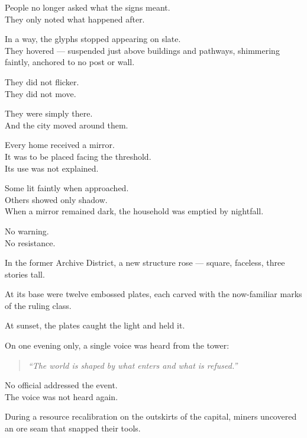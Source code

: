 \documentclass[12pt]{article}
\begin{document}
\vspace{1em}

People no longer asked what the signs meant.\\
They only noted what happened after.

\vspace{1em}

In a way, the glyphs stopped appearing on slate.\\
They hovered — suspended just above buildings and pathways, shimmering faintly, anchored to no post or wall.

They did not flicker.\\
They did not move.

They were simply there.\\
And the city moved around them.

\vspace{1em}

Every home received a mirror.\\
It was to be placed facing the threshold.\\
Its use was not explained.

Some lit faintly when approached.\\
Others showed only shadow.\\
When a mirror remained dark, the household was emptied by nightfall.

No warning.\\
No resistance.

\vspace{1em}

In the former Archive District, a new structure rose — square, faceless, three stories tall.

At its base were twelve embossed plates, each carved with the now-familiar marks of the ruling class.

At sunset, the plates caught the light and held it.

On one evening only, a single voice was heard from the tower:

\begin{quote}
\textit{“The world is shaped by what enters and what is refused.”}
\end{quote}

No official addressed the event.\\
The voice was not heard again.

\vspace{1em}

During a resource recalibration on the outskirts of the capital, miners uncovered an ore seam that snapped their tools.
\end{document}
